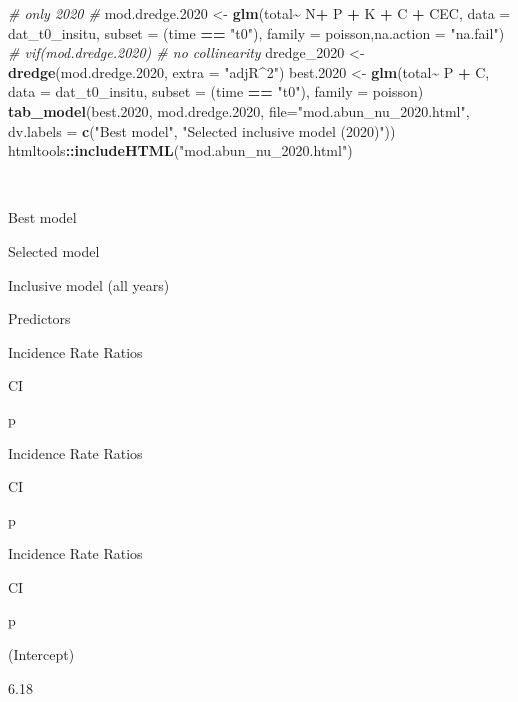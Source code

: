 \documentclass[
]{article}
\newenvironment{Shaded}{\begin{snugshade}}{\end{snugshade}}
\newcommand{\AttributeTok}[1]{\textcolor[rgb]{0.13,0.29,0.53}{#1}}
\newcommand{\CommentTok}[1]{\textcolor[rgb]{0.56,0.35,0.01}{\textit{#1}}}
\newcommand{\FloatTok}[1]{\textcolor[rgb]{0.00,0.00,0.81}{#1}}
\newcommand{\FunctionTok}[1]{\textcolor[rgb]{0.13,0.29,0.53}{\textbf{#1}}}
\newcommand{\NormalTok}[1]{#1}
\newcommand{\OtherTok}[1]{\textcolor[rgb]{0.56,0.35,0.01}{#1}}
\newcommand{\SpecialCharTok}[1]{\textcolor[rgb]{0.81,0.36,0.00}{\textbf{#1}}}
\newcommand{\StringTok}[1]{\textcolor[rgb]{0.31,0.60,0.02}{#1}}
\begin{document}
\begin{Shaded}
\begin{Highlighting}[]
\CommentTok{\# only 2020 \#}
\NormalTok{mod.dredge}\FloatTok{.2020} \OtherTok{\textless{}{-}} \FunctionTok{glm}\NormalTok{(total}\SpecialCharTok{\textasciitilde{}}\NormalTok{ N}\SpecialCharTok{+}\NormalTok{ P }\SpecialCharTok{+}\NormalTok{ K }\SpecialCharTok{+}\NormalTok{ C }\SpecialCharTok{+}\NormalTok{ CEC, }\AttributeTok{data =}\NormalTok{ dat\_t0\_insitu, }\AttributeTok{subset =}\NormalTok{ (time }\SpecialCharTok{==} \StringTok{"t0"}\NormalTok{), }\AttributeTok{family =}\NormalTok{ poisson,}\AttributeTok{na.action =} \StringTok{"na.fail"}\NormalTok{)}
\CommentTok{\# vif(mod.dredge.2020) \# no collinearity}
\NormalTok{dredge\_2020 }\OtherTok{\textless{}{-}} \FunctionTok{dredge}\NormalTok{(mod.dredge}\FloatTok{.2020}\NormalTok{, }\AttributeTok{extra =} \StringTok{"adjR\^{}2"}\NormalTok{)}
\NormalTok{best}\FloatTok{.2020} \OtherTok{\textless{}{-}} \FunctionTok{glm}\NormalTok{(total}\SpecialCharTok{\textasciitilde{}}\NormalTok{ P }\SpecialCharTok{+}\NormalTok{ C, }\AttributeTok{data =}\NormalTok{ dat\_t0\_insitu, }\AttributeTok{subset =}\NormalTok{ (time }\SpecialCharTok{==} \StringTok{"t0"}\NormalTok{), }\AttributeTok{family =}\NormalTok{ poisson)}
\FunctionTok{tab\_model}\NormalTok{(best}\FloatTok{.2020}\NormalTok{, mod.dredge}\FloatTok{.2020}\NormalTok{, }\AttributeTok{file=}\StringTok{"mod.abun\_nu\_2020.html"}\NormalTok{, }\AttributeTok{dv.labels =} \FunctionTok{c}\NormalTok{(}\StringTok{"Best model"}\NormalTok{, }\StringTok{"Selected inclusive model (2020)"}\NormalTok{))}
\NormalTok{htmltools}\SpecialCharTok{::}\FunctionTok{includeHTML}\NormalTok{(}\StringTok{"mod.abun\_nu\_2020.html"}\NormalTok{)}
\end{Highlighting}
\end{Shaded}

~

Best model

Selected model

Inclusive model (all years)

Predictors

Incidence Rate Ratios

CI

p

Incidence Rate Ratios

CI

p

Incidence Rate Ratios

CI

p

(Intercept)

6.18
\end{document}
